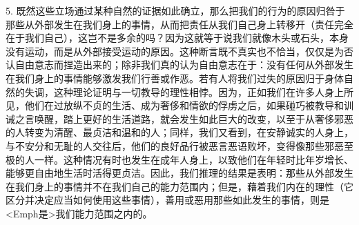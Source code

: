 5. 既然这些立场通过某种自然的证据如此确立，那么把我们的行为的原因归咎于那些从外部发生在我们身上的事情，从而把责任从我们自己身上转移开（责任完全在于我们自己），这岂不是多余的吗？因为这就等于说我们就像木头或石头，本身没有运动，而是从外部接受运动的原因。这种断言既不真实也不恰当，仅仅是为否认自由意志而捏造出来的；除非我们真的认为自由意志在于：没有任何从外部发生在我们身上的事情能够激发我们行善或作恶。若有人将我们过失的原因归于身体自然的失调，这种理论证明与一切教导的理性相悖。因为，正如我们在许多人身上所见，他们在过放纵不贞的生活、成为奢侈和情欲的俘虏之后，如果碰巧被教导和训诫之言唤醒，踏上更好的生活道路，就会发生如此巨大的改变，以至于从奢侈邪恶的人转变为清醒、最贞洁和温和的人；同样，我们又看到，在安静诚实的人身上，与不安分和无耻的人交往后，他们的良好品行被恶言恶语败坏，变得像那些邪恶至极的人一样。这种情况有时也发生在成年人身上，以致他们在年轻时比年岁增长、能够更自由地生活时活得更贞洁。因此，我们推理的结果是表明：那些从外部发生在我们身上的事情并不在我们自己的能力范围内；但是，藉着我们内在的理性（它区分并决定应当如何使用这些事情），善用或恶用那些如此发生的事情，则是<Emph{是}>我们能力范围之内的。\par

